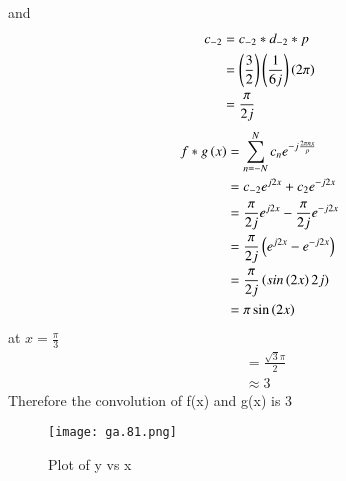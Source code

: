 \documentclass[journal,12pt,twocolumn]{IEEEtran}
\theoremstyle{remark}
\begin{document}
and
\begin{align}
    c_{-2}&=c_{-2}*d_{-2}*p\\
    &=\left(\frac{3}{2}\right)\left(\frac{1}{6j}\right)\left(2\pi\right)\\
    &=\frac{\pi}{2j}
\end{align}
\begin{align}
   {f*g}\left(x\right)&=\sum_{n=-N}^{N}c_{n} e^{-j\frac{2\pi nx}{p}}\\
    &=c_{-2}e^{j2x} + c_{2}e^{-j2x}\\
    &=\frac{\pi}{2j}e^{j2x}-\frac{\pi}{2j}e^{-j2x}\\
    &=\frac{\pi}{2j}\left(e^{j2x}-e^{-j2x}\right)\\
    &=\frac{\pi}{2j}\left(sin\left(2x\right)2j\right)\\
    &=\pi \sin\left(2x\right)\\
\end{align}
at $x=\frac{\pi}{3}$
\begin{align}
    &=\frac{\sqrt{3}\pi}{2}\\
    &\approx 3
\end{align}
Therefore the convolution of f(x) and g(x) is 3
\begin{figure}[!h]
    \centering
    \texttt{[image: ga.81.png]}
    \caption{Plot of y vs x}
    \label{fig:1}
\end{figure}
\end{document}
